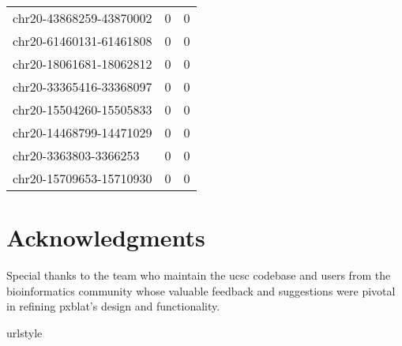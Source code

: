 \documentclass[10pt,letterpaper]{article}
\begin{document}
{\begin{longtable}{lSS}
	chr20-43868259-43870002 & 0      & 0        \\
	chr20-61460131-61461808 & 0      & 0        \\
	chr20-18061681-18062812 & 0      & 0        \\
	chr20-33365416-33368097 & 0      & 0        \\
	chr20-15504260-15505833 & 0      & 0        \\
	chr20-14468799-14471029 & 0      & 0        \\
	chr20-3363803-3366253   & 0      & 0        \\
	chr20-15709653-15710930 & 0      & 0        \\
\end{longtable}



\section*{Acknowledgments}

Special thanks to the team who maintain the \gls{ucsc} codebase and users from the bioinformatics community whose valuable feedback and suggestions were pivotal in refining \gls{pxblat}'s design and functionality.

\nolinenumbers

%
%
%
%
%
%
%

\begin{thebibliography}{7}
	\providecommand{\natexlab}[1]{#1}
	\providecommand{\url}[1]{\texttt{#1}}
	\expandafter\ifx\csname urlstyle\endcsname\relax
		\providecommand{\doi}[1]{doi: #1}\else
		\providecommand{\doi}{doi: \begingroup \urlstyle{rm}\Url}\fi


\end{thebibliography}}
\end{document}
